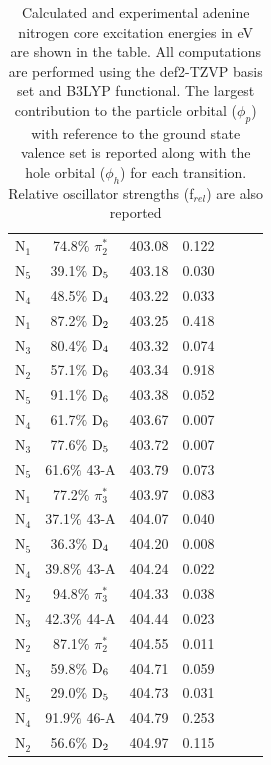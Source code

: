 \documentclass[12pt]{article}
\begin{document}
\begin{table}
\begin{tabular}{c@{\hskip 0.22in}c@{\hskip 0.22in}c@{\hskip 0.22in}c@{\hskip 0.52in}c@{\hskip 0.22in}c@{\hskip 0.22in}c}
    N$_1$
 &   74.8$\%$ $\pi_2^*$  & 403.08 & 0.122 \\
    N$_5$
 &   39.1$\%$ $\rm D_5$  & 403.18 & 0.030 \\
    N$_4$
 &   48.5$\%$ $\rm D_4$  & 403.22 & 0.033 \\
    N$_1$
 &   87.2$\%$ $\rm D_2$  & 403.25 & 0.418 \\
    N$_3$
 &   80.4$\%$ $\rm D_4$  & 403.32 & 0.074 \\
    N$_2$
 &   57.1$\%$ $\rm D_6$  & 403.34 & 0.918 \\
    N$_5$
 &   91.1$\%$ $\rm D_6$  & 403.38 & 0.052 
 \vspace{0.1in}\\
    N$_4$
 &   61.7$\%$ $\rm D_6$  & 403.67 & 0.007 \\
    N$_3$
 &   77.6$\%$ $\rm D_5$  & 403.72 & 0.007 \\
    N$_5$
 &   61.6$\%$ 43-A  & 403.79 & 0.073 \\
    N$_1$
 &   77.2$\%$ $\pi_3^*$  & 403.97 & 0.083 \\
    N$_4$
 &   37.1$\%$ 43-A  & 404.07 & 0.040 \\
    N$_5$
 &   36.3$\%$ $\rm D_4$  & 404.20 & 0.008 \\
    N$_4$
 &   39.8$\%$ 43-A  & 404.24 & 0.022 \\
    N$_2$
 &   94.8$\%$ $\pi_3^*$  & 404.33 & 0.038 \\
    N$_3$
 &   42.3$\%$ 44-A  & 404.44 & 0.023 \\
    N$_2$
 &   87.1$\%$ $\pi_2^*$  & 404.55 & 0.011 \\
    N$_3$
 &   59.8$\%$ $\rm D_6$  & 404.71 & 0.059 \\
    N$_5$
 &   29.0$\%$ $\rm D_5$  & 404.73 & 0.031 \\
    N$_4$
 &   91.9$\%$ 46-A  & 404.79 & 0.253 \\
    N$_2$
 &   56.6$\%$ $\rm D_2$  & 404.97 & 0.115 \\
   \end{tabular}
   \caption{Calculated and experimental adenine nitrogen core excitation energies in eV are shown in the table. All computations are performed using the def2-TZVP basis set and B3LYP functional. The largest contribution to the particle orbital ($\phi_p$) with reference to the ground state valence set is reported along with the hole orbital ($\phi_h$) for each transition. Relative oscillator strengths (f$_{rel}$) are also reported}
 \label{fig: adenine_k_nitrogen}
 \end{table}
\end{document}
